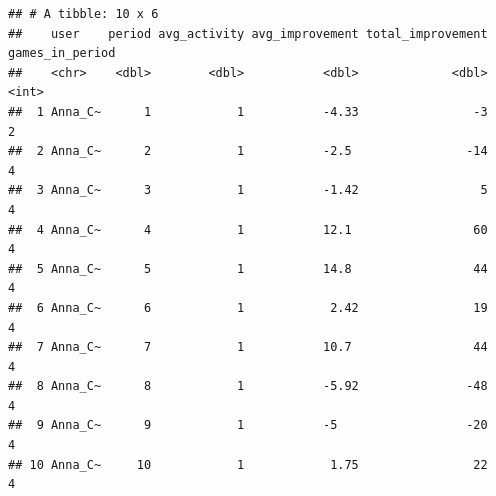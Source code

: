 \documentclass[
]{article}
\begin{document}
\begin{verbatim}
## # A tibble: 10 x 6
##    user    period avg_activity avg_improvement total_improvement games_in_period
##    <chr>    <dbl>        <dbl>           <dbl>             <dbl>           <int>
##  1 Anna_C~      1            1           -4.33                -3               2
##  2 Anna_C~      2            1           -2.5                -14               4
##  3 Anna_C~      3            1           -1.42                 5               4
##  4 Anna_C~      4            1           12.1                 60               4
##  5 Anna_C~      5            1           14.8                 44               4
##  6 Anna_C~      6            1            2.42                19               4
##  7 Anna_C~      7            1           10.7                 44               4
##  8 Anna_C~      8            1           -5.92               -48               4
##  9 Anna_C~      9            1           -5                  -20               4
## 10 Anna_C~     10            1            1.75                22               4
\end{verbatim}
\end{document}
